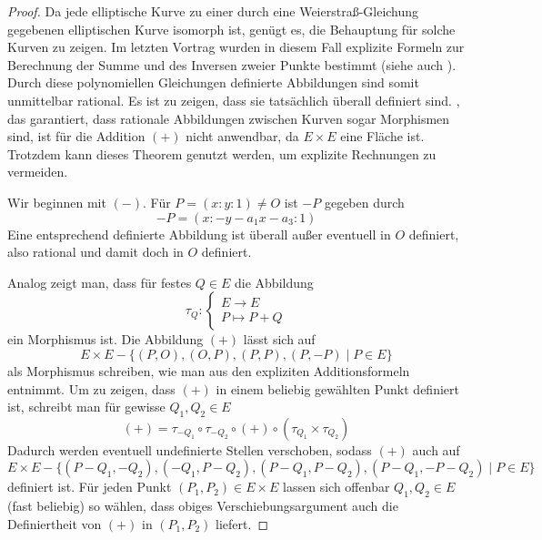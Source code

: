 \documentclass{amsart}
\theoremstyle{plain}
\theoremstyle{definition}
\begin{document}
\begin{proof}
	Da jede elliptische Kurve zu einer durch eine Weierstraß-Gleichung gegebenen elliptischen Kurve isomorph ist, genügt es, die Behauptung für solche Kurven zu zeigen.
	Im letzten Vortrag wurden in diesem Fall explizite Formeln zur Berechnung der Summe und des Inversen zweier Punkte bestimmt (siehe auch \cite[III. 2.3]{silverman}).
	Durch diese polynomiellen Gleichungen definierte Abbildungen sind somit unmittelbar rational.
	Es ist zu zeigen, dass sie tatsächlich überall definiert sind.
	\cite[II. Th. 2.3]{silverman}, das garantiert, dass rationale Abbildungen zwischen Kurven sogar Morphismen sind, ist für die Addition $(+)$ nicht anwendbar, da $E \times E$ eine Fläche ist.
	Trotzdem kann dieses Theorem genutzt werden, um explizite Rechnungen zu vermeiden.

	Wir beginnen mit $({-})$. Für $P = (x : y : 1) \neq O$ ist $-P$ gegeben durch
	\begin{equation*}
		-P = (x : -y - a_1 x - a_3 : 1)
	\end{equation*}
	Eine entsprechend definierte Abbildung ist überall außer eventuell in $O$ definiert, also rational und damit doch  in $O$ definiert.

	Analog zeigt man, dass für festes $Q \in E$ die Abbildung
	\begin{equation*}
		\tau_Q : \begin{cases}
			E \rightarrow E \\
			P \mapsto P + Q
		\end{cases}
	\end{equation*}
	ein Morphismus ist.
	Die Abbildung $(+)$ lässt sich auf
	\begin{equation*}
		E \times E - \{(P, O), (O, P), (P, P), (P, -P) \mid P \in E \}
	\end{equation*}
	als Morphismus schreiben, wie man aus den expliziten Additionsformeln entnimmt.
	Um zu zeigen, dass $(+)$ in einem beliebig gewählten Punkt definiert ist, schreibt man für gewisse $Q_1, Q_2 \in E$
	\begin{equation*}
		(+) = \tau_{-Q_1} \circ \tau_{-Q_2} \circ (+) \circ (\tau_{Q_1} \times \tau_{Q_2})
	\end{equation*}
	Dadurch werden eventuell undefinierte Stellen \glqq verschoben\grqq, sodass $(+)$ auch auf
	\begin{equation*}
		E \times E - \{(P - Q_1, -Q_2), (-Q_1, P - Q_2), (P - Q_1, P - Q_2), (P - Q_1, -P - Q_2) \mid P \in E \}
	\end{equation*}
	definiert ist.
	Für jeden Punkt $(P_1, P_2) \in E \times E$ lassen sich offenbar $Q_1, Q_2 \in E$ (fast beliebig) so wählen, dass obiges Verschiebungsargument auch die Definiertheit von $(+)$ in $(P_1, P_2)$ liefert.
\end{proof}


\printbibliography
\end{document}
